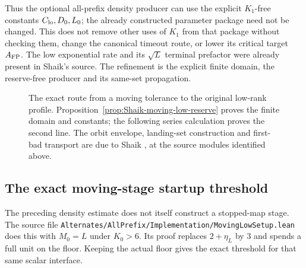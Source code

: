 Thus the optional all-prefix density producer can use the explicit
\(K_1\)-free constants \(C_{\rm lo},D_0,L_0\); the already constructed
parameter package need not be changed. This does not remove other
uses of \(K_1\) from that package without checking them, change the
canonical timeout route, or lower its critical target \(A_{\rm FP}\).
The low exponential rate and its \(\sqrt L\) terminal prefactor were
already present in Shaik's source. The refinement is the explicit
finite domain, the reserve-free producer and its same-set propagation.

\begin{figure}[ht]
\centering
{}
\caption{The exact route from a moving tolerance to the original low-rank
profile. Proposition~\ref{prop:Shaik-moving-low-reserve} proves the finite
domain and constants; the following series calculation proves the second
line. The orbit envelope, landing-set construction and first-bad transport
are due to Shaik \cite{Shaik2026v324}, at the source modules identified above.}
\end{figure}

\subsection{The exact moving-stage startup threshold}

The preceding density estimate does not itself construct a stopped-map
stage. The source file
\texttt{Alternates/AllPrefix/Implementation/MovingLowSetup.lean}
does this with \(M_0=L\) under \(K_0>6\).
Its proof replaces \(2+\eta_L\) by \(3\) and spends a full unit
on the floor. Keeping the actual floor gives the exact threshold
for that same scalar interface.

